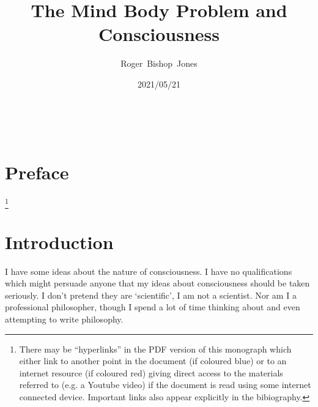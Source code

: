 \documentclass[10pt,titlepage]{article}
\title{\LARGE\bf The Mind Body Problem and Consciousness}
\author{Roger~Bishop~Jones}
\date{\small 2021/05/21}
\newcommand{\ignore}[1]{}
\begin{document}
                               
\begin{titlepage}
\maketitle





\end{titlepage}

\ \

\ignore{
\begin{centering}
{}
\end{centering}
}%

\setcounter{tocdepth}{2}
{\parskip-0pt\tableofcontents}


\pagebreak

\section*{Preface}


\footnote{There may be ``hyperlinks'' in the PDF version of this monograph which either link to another point in the document  (if coloured blue) or to an internet resource  (if coloured red) giving direct access to the materials referred to (e.g. a Youtube video) if the document is read using some internet connected device.
Important links also appear explicitly in the bibiography.}

\section{Introduction}

I have some ideas about the nature of consciousness.
I have no qualifications which might persuade anyone that my ideas about consciousness should be taken seriously.
I don't pretend they are `scientific', I am not a scientist.
Nor am I a professional philosopher, though I spend a lot of time thinking about and even attempting to write philosophy.
\end{document}
